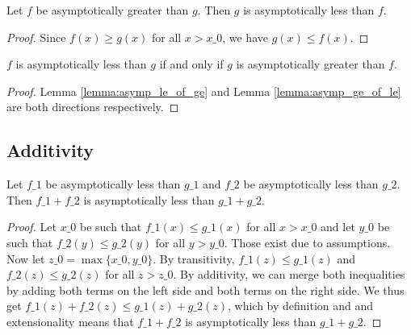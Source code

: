 \begin{lemma}
    \label{lemma:asymp_ge_of_le}
    \leanok
    Let $f$ be asymptotically greater than $g$. Then $g$ is asymptotically
    less than $f$.
\end{lemma}

\begin{proof}
    \leanok
    Since $f(x) \ge g(x)$ for all $x > x\_0$, we have $g(x) \le f(x)$.
\end{proof}

\begin{theorem}
    \label{thm:asymp_le_ge_iff}
    \leanok
    $f$ is asymptotically less than $g$ if and only if $g$ is asymptotically
    greater than $f$.
\end{theorem}

\begin{proof}
    \leanok
    Lemma \ref{lemma:asymp_le_of_ge} and Lemma \ref{lemma:asymp_ge_of_le} are both directions
    respectively.
\end{proof}


\subsection{Additivity}

\begin{lemma}
    \label{lemma:asymp_le_add}
    \leanok
    Let $f\_1$ be asymptotically less than $g\_1$ and $f\_2$ be asymptotically less
    than $g\_2$. Then $f\_1 + f\_2$ is asymptotically less than $g\_1 + g\_2$.
\end{lemma}

\begin{proof}
    \leanok
    Let $x\_0$ be such that $f\_1(x) \le g\_1(x)$ for all $x > x\_0$ and let $y\_0$ be
    such that $f\_2(y) \le g\_2(y)$ for all $y > y\_0$. Those exist due to assumptions.
    Now let $z\_0 = \max \{ x\_0, y\_0 \}$. By transitivity, $f\_1(z) \le g\_1(z)$ and 
    $f\_2(z) \le g\_2(z)$ for all $z > z\_0$. By additivity, we can merge both 
    inequalities by adding both terms on the left side and both terms on the right side.
    We thus get $f\_1(z) + f\_2(z) \le g\_1(z) + g\_2(z)$, which by definition and 
    and extensionality means that $f\_1 + f\_2$ is asymptotically less than $g\_1 + g\_2$.
\end{proof}

